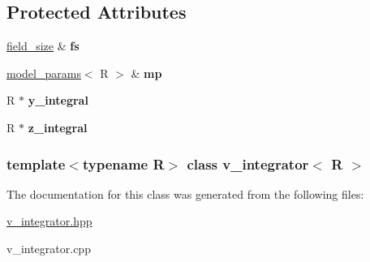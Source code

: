 \subsection*{Protected Attributes}
\begin{DoxyCompactItemize}
\item 
\hypertarget{classv__integrator_a42fcb5ffe9d4f940f6bee84690129705}{
\hyperlink{structfield__size}{field\_\-size} \& {\bfseries fs}}
\label{classv__integrator_a42fcb5ffe9d4f940f6bee84690129705}

\item 
\hypertarget{classv__integrator_a48e2b9f1f7f3cdbd3a56207895360e11}{
\hyperlink{structmodel__params}{model\_\-params}$<$ R $>$ \& {\bfseries mp}}
\label{classv__integrator_a48e2b9f1f7f3cdbd3a56207895360e11}

\item 
\hypertarget{classv__integrator_afbecddebfd42197af33e193d58473a5a}{
R $\ast$ {\bfseries y\_\-integral}}
\label{classv__integrator_afbecddebfd42197af33e193d58473a5a}

\item 
\hypertarget{classv__integrator_a548ee286da181c22399d7b96c181b4d1}{
R $\ast$ {\bfseries z\_\-integral}}
\label{classv__integrator_a548ee286da181c22399d7b96c181b4d1}

\end{DoxyCompactItemize}
\subsubsection*{template$<$typename R$>$ class v\_\-integrator$<$ R $>$}



The documentation for this class was generated from the following files:\begin{DoxyCompactItemize}
\item 
\hyperlink{v__integrator_8hpp}{v\_\-integrator.hpp}\item 
v\_\-integrator.cpp\end{DoxyCompactItemize}
